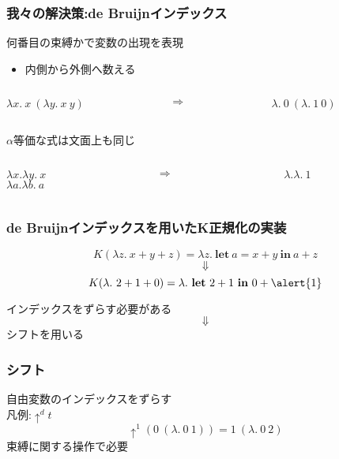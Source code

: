\documentclass[dvipdfmx,cjk,xcolor=dvipsnames,envcountsect,notheorems,12pt]{beamer}
\theoremstyle{definition}
\newcommand{\keyword}[1]{\mathbf{#1}}
\newcommand{\LET}{\keyword{let}}
\newcommand{\IN}{\keyword{in}}
\begin{document}
\begin{frame}
	\frametitle{我々の解決策:de Bruijnインデックス}
	\LARGE
	何番目の束縛かで変数の出現を表現
	\begin{itemize}
		\item 内側から外側へ数える
	\end{itemize}
	\begin{columns}
		\begin{column}{0.4\textwidth}
			$\lambda x.~x~(\lambda y.~x~y)$
		\end{column}
		\begin{column}{0.1\textwidth}
			$\Rightarrow$
		\end{column}
		\begin{column}{0.4\textwidth}
			$\lambda.~0~(\lambda.~1~0)$
		\end{column}
	\end{columns}

	\vfill

	$\alpha$等価な式は文面上も同じ
	\begin{columns}
		\begin{column}{0.4\textwidth}
			\begin{center}
				$\lambda x.\lambda y.~x$\\
				$\lambda a.\lambda b.~a$
			\end{center}
		\end{column}
		\begin{column}{0.1\textwidth}
			$\Rightarrow$
		\end{column}
		\begin{column}{0.4\textwidth}
			$\lambda.\lambda.~1$
		\end{column}
	\end{columns}
\end{frame}

\begin{frame}[fragile]
	\frametitle{de Bruijnインデックスを用いたK正規化の実装}
	{\Large \[K(\lambda z.~x+y+z) = \lambda z.~\LET~a=x+y~\IN~a+z \]
	\[\Downarrow\]
	\[ K(\lambda.~2+1+0) = \lambda.~\LET~2+1~\IN~0+\alert{1}\]}
	\vfill
	\begin{center}\LARGE 
		\alert{インデックスをずらす必要がある}
		\[\Downarrow\]
		シフトを用いる
	\end{center}
\end{frame}

\begin{frame}
	\frametitle{シフト}
	\LARGE 自由変数のインデックスをずらす\\
	凡例:$\uparrow^d t$
	\vfill
	\[\uparrow^1(0~(\lambda.~0~1)) = 1~(\lambda.~0~2)\]
	\vfill
	束縛に関する操作で必要
\end{frame}
\end{document}
